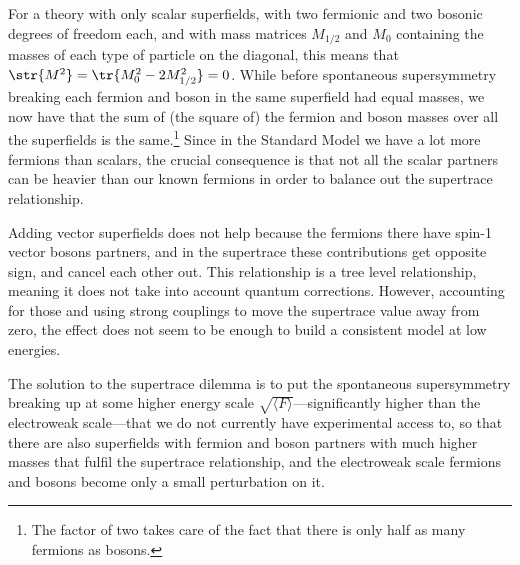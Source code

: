 \documentclass[notes.tex]{subfiles}
\begin{document}

For a theory with only scalar superfields, with two fermionic and two bosonic degrees of freedom each, and with mass matrices $M_{1/2}$ and $M_0$ containing the masses of each type of particle on the diagonal, this means that $\str{M^2}=\tr{M_0^2 - 2M_{1/2}^2}= 0$. While before spontaneous supersymmetry breaking each fermion and boson in the same superfield had equal masses, we now have that the sum of (the square of) the fermion and boson masses over all the superfields is the same.\footnote{The factor of two takes care of the fact that there is only half as many fermions as bosons.} Since in the Standard Model we have a lot more fermions than scalars, the crucial consequence is that not all the scalar partners can be heavier than our known fermions in order to balance out the supertrace relationship.

Adding vector superfields does not help because the fermions there have spin-1 vector bosons partners, and in the supertrace these contributions get opposite sign, and cancel each other out. This relationship is a tree level relationship, meaning it does not take into account quantum corrections. However, accounting for those and using strong couplings to move the supertrace value away from zero, the effect does not seem to be enough to build a consistent model at low energies.

The solution to the supertrace dilemma is to put the spontaneous supersymmetry breaking up at some higher energy scale $\sqrt{\langle F \rangle}$---significantly higher than the electroweak scale---that we do not currently have experimental access to, so that there are also superfields with fermion and boson partners with much higher masses that fulfil the supertrace relationship, and the electroweak scale fermions and bosons become only a small perturbation on it.



\end{document}
